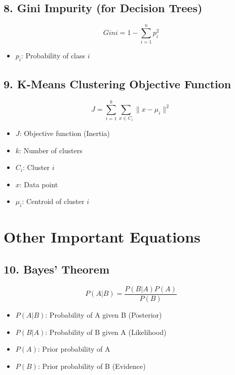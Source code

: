 \documentclass{article}
\begin{document}
\subsection{8. Gini Impurity (for Decision Trees)}
\begin{equation}
Gini = 1 - \sum_{i=1}^{n} p_i^2
\end{equation}
\begin{itemize}
    \item \(p_i\): Probability of class \(i\)
\end{itemize}

\subsection{9. K-Means Clustering Objective Function}
\begin{equation}
J = \sum_{i=1}^{k} \sum_{x \in C_i} \| x - \mu_i \|^2
\end{equation}
\begin{itemize}
    \item \(J\): Objective function (Inertia)
    \item \(k\): Number of clusters
    \item \(C_i\): Cluster \(i\)
    \item \(x\): Data point
    \item \(\mu_i\): Centroid of cluster \(i\)
\end{itemize}

\section{Other Important Equations}

\subsection{10. Bayes’ Theorem}
\begin{equation}
P(A|B) = \frac{P(B|A) P(A)}{P(B)}
\end{equation}
\begin{itemize}
    \item \(P(A|B)\): Probability of A given B (Posterior)
    \item \(P(B|A)\): Probability of B given A (Likelihood)
    \item \(P(A)\): Prior probability of A
    \item \(P(B)\): Prior probability of B (Evidence)
\end{itemize}
\end{document}
